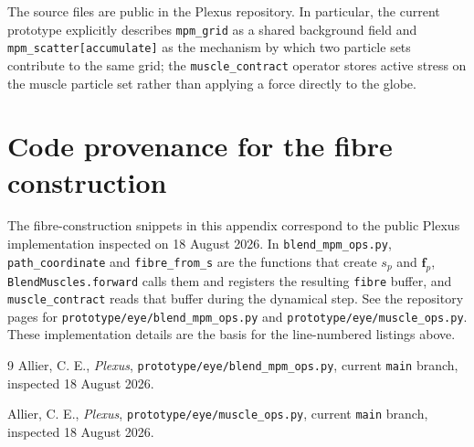\documentclass[11pt]{article}
\newcommand{\vect}[1]{\bm{#1}}
\begin{document}
The source files are public in the Plexus repository. In particular, the current prototype explicitly describes \texttt{mpm\_grid} as a shared background field and \texttt{mpm\_scatter[accumulate]} as the mechanism by which two particle sets contribute to the same grid; the \texttt{muscle\_contract} operator stores active stress on the muscle particle set rather than applying a force directly to the globe.

\section*{Code provenance for the fibre construction}
The fibre-construction snippets in this appendix correspond to the public Plexus
implementation inspected on 18 August 2026. In \texttt{blend\_mpm\_ops.py},
\texttt{path\_coordinate} and \texttt{fibre\_from\_s} are the functions that create
$s_p$ and $\vect f_p$, \texttt{BlendMuscles.forward} calls them and registers the
resulting \texttt{fibre} buffer, and \texttt{muscle\_contract} reads that buffer during
the dynamical step. See the repository pages for
\texttt{prototype/eye/blend\_mpm\_ops.py} and
\texttt{prototype/eye/muscle\_ops.py}. These implementation details are the basis for
the line-numbered listings above.

\begin{thebibliography}{9}
Allier, C. E., \emph{Plexus}, \texttt{prototype/eye/blend\_mpm\_ops.py},
current \texttt{main} branch, inspected 18 August 2026.

Allier, C. E., \emph{Plexus}, \texttt{prototype/eye/muscle\_ops.py},
current \texttt{main} branch, inspected 18 August 2026.
\end{thebibliography}
\end{document}
